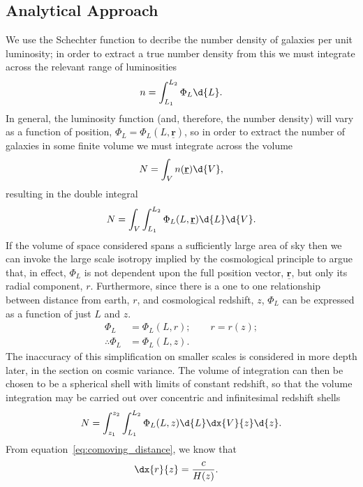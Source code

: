 	\subsection{Analytical Approach} %
	\label{sub:analytical_approach}
		We use the Schechter function to decribe the number density of galaxies per unit luminosity; in order to extract a true number density from this we must integrate across the relevant range of luminosities
		\begin{align}
			n = \int_{L_1}^{L_2}\Phi_L \d{L}.
		\end{align}
		In general, the luminosity function (and, therefore, the number density) will vary as a function of position, $\Phi_L = \Phi_L (L,\underline{\mathbf{r}})$, so in order to extract the number of galaxies in some finite volume we must integrate across the volume
		\begin{align}
			N = \int_V n(\underline{\mathbf{r}}) \d{V} ,
		\end{align}
		resulting in the double integral
		\begin{align}
			N = \int_V \int_{L_1}^{L_2} \Phi_L(L,\underline{\mathbf{r}}) \d{L} \d{V} .
		\end{align}
		If the volume of space considered spans a sufficiently large area of sky then we can invoke the large scale isotropy implied by the cosmological principle to argue that, in effect, $\Phi_L$ is not dependent upon the full position vector, $\underline{\mathbf{r}}$, but only its radial component, $r$. Furthermore, since there is a one to one relationship between distance from earth, $r$, and cosmological redshift, $z$, $\Phi_L$ can be expressed as a function of just $L$ and $z$.
		\begin{align}
			\Phi_L &= \Phi_L(L,r); \qquad r= r(z);\\
			\therefore	\Phi_L &= \Phi_L(L,z).
		\end{align}
		The inaccuracy of this simplification on smaller scales is considered in more depth later, in the section on cosmic variance. The volume of integration can then be chosen to be a spherical shell with limits of constant redshift, so that the volume integration may be carried out over concentric and infinitesimal redshift shells
		\begin{align}
			N = \int_{z_1}^{z_2} \int_{L_1}^{L_2} \Phi_L(L,z) \d{L} \dx{V}{z} \d{z}.
		\end{align}
		From equation~\ref{eq:comoving_distance}, we know that
		\begin{align}
			\dx{r}{z} &= \frac{c}{H(z)}.
		\end{align}
